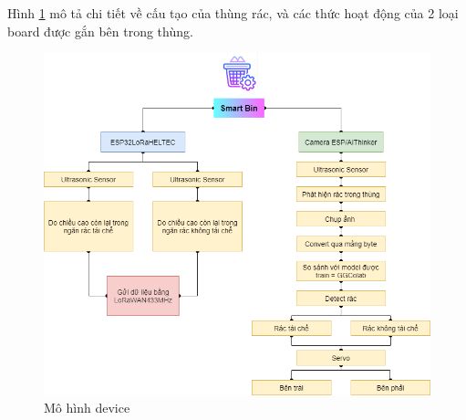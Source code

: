 Hình \ref{fig:chart_smartbin} mô tả chi tiết về cấu tạo của thùng rác, và các thức hoạt động của 2 loại board được gắn bên trong thùng. 
\begin{figure}[H]
    \centering
    \includegraphics[width=\textwidth]{images/Chart_smartbin.png}
    \caption{Mô hình device}
    \label{fig:chart_smartbin}
\end{figure}

